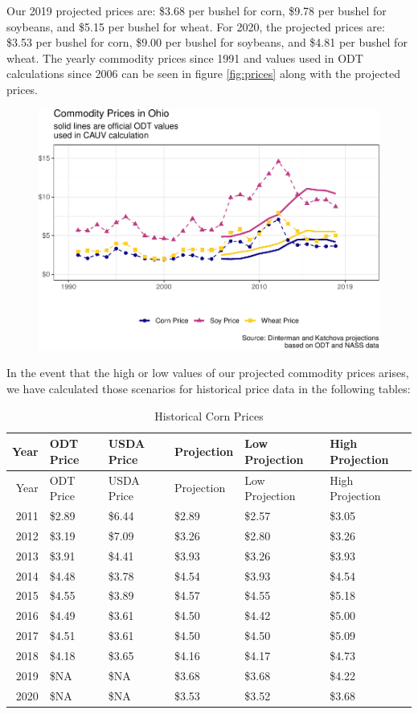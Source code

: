 \documentclass[]{article}
\begin{document}
Our 2019 projected prices are: \$3.68 per bushel for corn, \$9.78 per
bushel for soybeans, and \$5.15 per bushel for wheat. For 2020, the
projected prices are: \$3.53 per bushel for corn, \$9.00 per bushel for
soybeans, and \$4.81 per bushel for wheat. The yearly commodity prices
since 1991 and values used in ODT calculations since 2006 can be seen in
figure \ref{fig:prices} along with the projected prices.

\begin{figure}[H]
\includegraphics[width=1\linewidth]{4-projections-2019-2020_files/figure-latex/viz-prices-1} \caption{\label{fig:prices}}\label{fig:viz-prices}
\end{figure}

In the event that the high or low values of our projected commodity
prices arises, we have calculated those scenarios for historical price
data in the following tables:

\begin{longtable}[]{@{}rlllll@{}}
\caption{Historical Corn Prices}\tabularnewline
\toprule
Year & ODT Price & USDA Price & Projection & Low Projection & High
Projection\tabularnewline
\midrule
\endfirsthead
\toprule
Year & ODT Price & USDA Price & Projection & Low Projection & High
Projection\tabularnewline
\midrule
\endhead
2011 & \$2.89 & \$6.44 & \$2.89 & \$2.57 & \$3.05\tabularnewline
2012 & \$3.19 & \$7.09 & \$3.26 & \$2.80 & \$3.26\tabularnewline
2013 & \$3.91 & \$4.41 & \$3.93 & \$3.26 & \$3.93\tabularnewline
2014 & \$4.48 & \$3.78 & \$4.54 & \$3.93 & \$4.54\tabularnewline
2015 & \$4.55 & \$3.89 & \$4.57 & \$4.55 & \$5.18\tabularnewline
2016 & \$4.49 & \$3.61 & \$4.50 & \$4.42 & \$5.00\tabularnewline
2017 & \$4.51 & \$3.61 & \$4.50 & \$4.50 & \$5.09\tabularnewline
2018 & \$4.18 & \$3.65 & \$4.16 & \$4.17 & \$4.73\tabularnewline
2019 & \$NA & \$NA & \$3.68 & \$3.68 & \$4.22\tabularnewline
2020 & \$NA & \$NA & \$3.53 & \$3.52 & \$3.68\tabularnewline
\bottomrule
\end{longtable}
\end{document}
